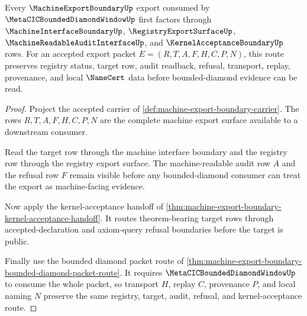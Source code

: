 \begin{theorem}
\label{thm:machine-export-boundary-forward-interface-route}
Every $\MachineExportBoundaryUp$ export consumed by $\MetaCICBoundedDiamondWindowUp$ first factors through $\MachineInterfaceBoundaryUp$, $\RegistryExportSurfaceUp$, $\MachineReadableAuditInterfaceUp$, and $\KernelAcceptanceBoundaryUp$ rows. For an accepted export packet $E=(R,T,A,F,H,C,P,N)$, this route preserves registry status, target row, audit readback, refusal, transport, replay, provenance, and local $\NameCert$ data before bounded-diamond evidence can be read.
\end{theorem}
\begin{proof}
Project the accepted carrier of \autoref{def:machine-export-boundary-carrier}. The rows $R,T,A,F,H,C,P,N$ are the complete machine export surface available to a downstream consumer.

Read the target row through the machine interface boundary and the registry row through the registry export surface. The machine-readable audit row $A$ and the refusal row $F$ remain visible before any bounded-diamond consumer can treat the export as machine-facing evidence.

Now apply the kernel-acceptance handoff of \autoref{thm:machine-export-boundary-kernel-acceptance-handoff}. It routes theorem-bearing target rows through accepted-declaration and axiom-query refusal boundaries before the target is public.

Finally use the bounded diamond packet route of \autoref{thm:machine-export-boundary-bounded-diamond-packet-route}. It requires $\MetaCICBoundedDiamondWindowUp$ to consume the whole packet, so transport $H$, replay $C$, provenance $P$, and local naming $N$ preserve the same registry, target, audit, refusal, and kernel-acceptance route.
\end{proof}
